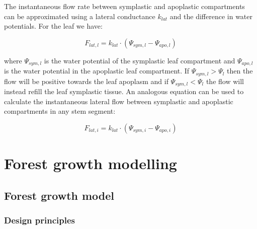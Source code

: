 \documentclass[]{book}
\begin{document}
The instantaneous flow rate between symplastic and apoplastic
compartments can be approximated using a lateral conductance \(k_{lat}\)
and the difference in water potentials. For the leaf we have:

\begin{equation}
F_{lat, l} = k_{lat} \cdot (\Psi_{sym, l} - \Psi_{apo,l})
\end{equation}

where \(\Psi_{sym, l}\) is the water potential of the symplastic leaf
compartment and \(\Psi_{apo,l}\) is the water potential in the
apoplastic leaf compartment. If \(\Psi_{sym, l} > \Psi_l\) then the flow
will be positive towards the leaf apoplasm and if
\(\Psi_{sym, l} < \Psi_l\) the flow will instead refill the leaf
symplastic tissue. An analogous equation can be used to calculate the
instantaneous lateral flow between symplastic and apoplastic
compartments in any stem segment:

\begin{equation}
F_{lat, i} = k_{lat} \cdot (\Psi_{sym, i} - \Psi_{apo, i})
\end{equation}

\part{Forest growth
modelling}\label{part-forest-growth-modelling}

\chapter{Forest growth model}\label{forest-growth-model}

\section{Design principles}\label{design-principles-2}
\end{document}

